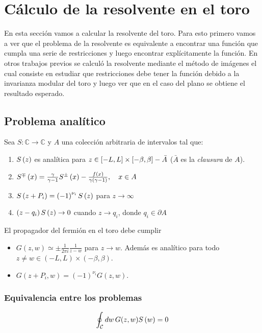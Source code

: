\documentclass[../main.tex]{subfiles}
\begin{document}
\section{Cálculo de la resolvente en el toro}

En esta sección vamos a calcular la resolvente del toro. Para esto primero vamos a ver que el problema de la resolvente es equivalente a encontrar una función que cumpla una serie de restricciones y luego encontrar explícitamente la función. En otros trabajos previos se calculó la resolvente mediante el método de imágenes el cual consiste en estudiar que restricciones debe tener la función debido a la invarianza modular del toro y luego ver que en el caso del plano se obtiene el resultado esperado.

\subsection{Problema analítico}

Sea $S: \mathbb C \to \mathbb C$ y $A$ una colección arbitraria de intervalos tal que:
\begin{enumerate}
	\item $S\left ( z \right )$ es analítica para $z \in \left [ -L, L \right ] \times \left [ - \beta, \beta \right ] - \bar A$ ($\bar A$ es la \textit{clausura} de $A$).
	
	\item $S^\mp\left ( x \right ) = \frac{\gamma}{\gamma - 1} S^\pm\left ( x \right ) - \frac{f\left ( x \right )}{\gamma \left ( \gamma - 1 \right )}, \quad x \in A$
	
	\item $S\left ( z + P_i \right ) = \left ( -1 \right )^{\nu_i} S\left ( z \right )$ para $z \to \infty$
	
	\item $\left ( z - q_i \right ) S\left ( z \right ) \to 0$ cuando $z \to q_i$, donde $q_i \in \partial A$
\end{enumerate}

El propagador del fermión en el toro debe cumplir
\begin{itemize}
	\item $\displaystyle G(z, w) \simeq \pm \frac 1{2 \pi i} \frac 1{z - w}$ para $z \to w$. Además es analítico para todo $z \neq w \in (-L, L) \times (-\beta, \beta)$.
	\item $G(z + P_i, w) = (-1)^{\nu_i} G(z, w)$.
\end{itemize}

\subsubsection{Equivalencia entre los problemas}
\begin{align*}
	\oint_{\mathcal C} dw\, G(z, w) S\left ( w \right ) = 0
\end{align*}
\end{document}

